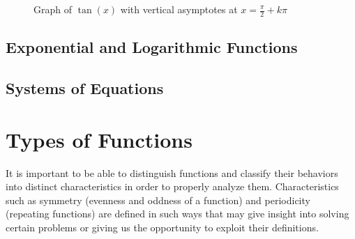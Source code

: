         \begin{figure}
            \centering
            \caption{Graph of $\tan(x)$ with vertical asymptotes at $x = \frac{\pi}{2} + k\pi$}
            \label{fig:tangentgraph}
        \end{figure}

        \subsection{Exponential and Logarithmic Functions}


        \subsection{Systems of Equations}

        \section{Types of Functions}
        It is important to be able to distinguish functions and classify their behaviors into distinct characteristics in order to properly analyze them. Characteristics such as symmetry (evenness and oddness of a function) and periodicity (repeating functions) are defined in such ways that may give insight into solving certain problems or giving us the opportunity to exploit their definitions.

